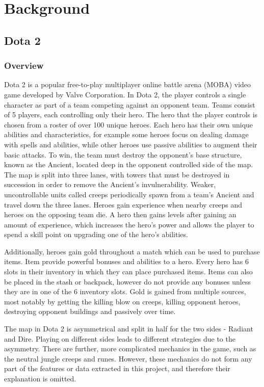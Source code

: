 \documentclass[Report.tex]{subfiles}
\begin{document}
\section{Background}

\subsection{Dota 2}
\subsubsection{Overview}
Dota 2 is a popular free-to-play multiplayer online battle arena (MOBA) video game developed by Valve Corporation. In Dota 2, the player controls a single character as part of a team competing against an opponent team. Teams consist of 5 players, each controlling only their hero. The hero that the player controls is chosen from a roster of over 100 unique heroes. Each hero has their own unique abilities and characteristics, for example some heroes focus on dealing damage with spells and abilities, while other heroes use passive abilities to augment their basic attacks. To win, the team must destroy the opponent's base structure, known as the Ancient, located deep in the opponent controlled side of the map. The map is split into three lanes, with towers that must be destroyed in succession in order to remove the Ancient's invulnerability. Weaker, uncontrollable units called creeps periodically spawn from a team's Ancient and travel down the three lanes. Heroes gain experience when nearby creeps and heroes on the opposing team die. A hero then gains levels after gaining an amount of experience, which increases the hero's power and allows the player to spend a skill point on upgrading one of the hero's abilities. 

Additionally, heroes gain gold throughout a match which can be used to purchase items. Item provide powerful bonuses and abilities to a hero. Every hero has 6 slots in their inventory in which they can place purchased items. Items can also be placed in the stash or backpack, however do not provide any bonuses unless they are in one of the 6 inventory slots. Gold is gained from multiple sources, most notably by getting the killing blow on creeps, killing opponent heroes, destroying opponent buildings and passively over time. 


The map in Dota 2 is asymmetrical and split in half for the two sides - Radiant and Dire. Playing on different sides leads to different strategies due to the asymmetry. There are further, more complicated mechanics in the game, such as the neutral jungle creeps and runes. However, these mechanics do not form any part of the features or data extracted in this project, and therefore their explanation is omitted. 
\end{document}
